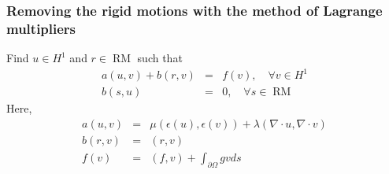 \begin{frame}
\frametitle{Removing the rigid motions with the method of Lagrange multipliers} 
Find $u\in H^1$ and $r \in \operatorname{RM}$ such that
\begin{eqnarray}
\label{el:lm:1}
a(u,v) + b(r, v) &=& f(v), \quad \forall v\in H^1 \\
\label{el:lm:2}
b(s, u) &=& 0, \quad \forall s \in \operatorname{RM}
\end{eqnarray}
Here,
\begin{eqnarray}
a(u,v) &=& \mu (\epsilon(u), \epsilon(v)) + \lambda (\nabla\cdot u, \nabla\cdot v)  \\
b(r, v) &=& (r, v) \\
f(v) &=& (f,v) + \int_{\partial \Omega} g v ds 
\end{eqnarray}
\end{frame}


